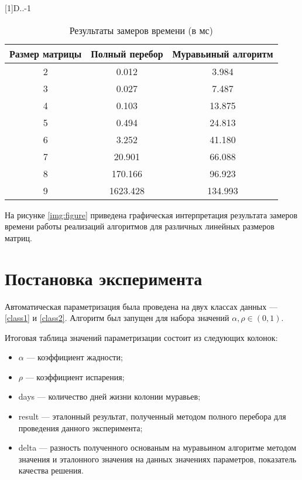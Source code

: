 \newcolumntype{d}[1]{D{.}{.}{-1}}

\begin{table}[h!]
	\begin{center}
		\begin{threeparttable}
			\captionsetup{justification=raggedright,singlelinecheck=off}
			\caption{Результаты замеров времени (в мс)}
			\label{table_measuring}
			\begin{tabular}{|c|c|c|}
				\hline
				Размер матрицы & Полный перебор & Муравьиный алгоритм \\
				\hline
				2 & 0.012 & 3.984\\
				\hline
				3 & 0.027 & 7.487\\
				\hline
				4 & 0.103 & 13.875\\
				\hline
				5 & 0.494 & 24.813\\
				\hline
				6 & 3.252 & 41.180\\
				\hline
				7 & 20.901 & 66.088\\
				\hline
				8 & 170.166 & 96.923\\
				\hline
				9 & 1623.428 & 134.993\\
				\hline
			\end{tabular}
		\end{threeparttable}
	\end{center}
\end{table}

На рисунке \ref{img:figure} приведена графическая интерпретация результата замеров времени работы реализаций алгоритмов для различных линейных размеров матриц.
\clearpage

\section{Постановка эксперимента}

Автоматическая параметризация была проведена на двух классах данных --- \ref{class1} и \ref{class2}. Алгоритм был запущен для набора значений $\alpha, \rho \in (0, 1)$.

Итоговая таблица значений параметризации состоит из следующих колонок:
\begin{itemize}[label=---]
	\item $\alpha$ --- коэффициент жадности;
	\item $\rho$ --- коэффициент испарения;
	\item days --- количество дней жизни колонии муравьев;
	\item result --- эталонный результат, полученный методом полного перебора для проведения данного эксперимента;
	\item delta --- разность полученного основаным на муравьином алгоритме методом значения и эталонного значения на данных значениях параметров, показатель качества решения.
\end{itemize}

